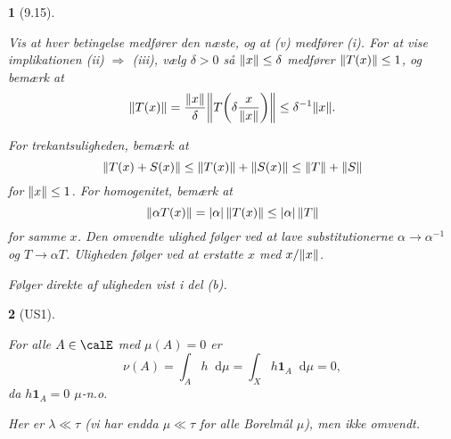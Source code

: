 \documentclass[a4paper, 11pt, article, danish, oneside]{memoir}
\newcommand{\blank}{\mathrel{\;\cdot\;}}
\newcommand{\blankifempty}[1]{\ifstrempty{#1}{\blank}{#1}}
\DeclarePairedDelimiter{\auxdelimlvert}{\lvert}{\rvert}
\DeclarePairedDelimiter{\auxdelimlVert}{\lVert}{\rVert}
\newcommand{\abs}[2][]{\auxdelimlvert[#1]{\blankifempty{#2}}}
\newcommand{\norm}[2][]{\auxdelimlVert[#1]{\blankifempty{#2}}}
\newcommand{\dif}{\mathop{}\!\mathrm{d}}
\newcommand{\indicator}[1]{\mathbf{1}_{#1}}
\newcommand\inv{^{-1}}
\newcommand{\pencilsymbol}{\raisebox{-2pt}{\normalfont\PencilLeft}}
\theoremstyle{changedotcustomnumber}
\theoremstyle{changedotbreakcustomnumber}
\newtheorem{opgavebreak}{\pencilsymbol}
\begin{document}
\begin{opgavebreak}[9.15]
\begin{solutionsec}
    \item Vis at hver betingelse medfører den næste, og at (v) medfører (i). For at vise implikationen (ii) $\Rightarrow$ (iii), vælg $\delta > 0$ så $\norm{x} \leq \delta$ medfører $\norm{T(x)} \leq 1$, og bemærk at
    \begin{equation*}
		\norm{T(x)}
			= \frac{\norm{x}}{\delta} \norm[\bigg]{T \biggl( \delta \frac{x}{\norm{x}} \biggr) }
			\leq \delta\inv \norm{x}.
	\end{equation*}

    \item For trekantsuligheden, bemærk at
    \begin{equation*}
        \norm{T(x) + S(x)}
            \leq \norm{T(x)} + \norm{S(x)}
            \leq \norm{T} + \norm{S}
    \end{equation*}
    for $\norm{x} \leq 1$. For homogenitet, bemærk at
    \begin{equation*}
        \norm{\alpha T(x)}
            = \abs{\alpha} \, \norm{T(x)}
            \leq \abs{\alpha} \, \norm{T}
    \end{equation*}
    for samme $x$. Den omvendte ulighed følger ved at lave substitutionerne $\alpha \to \alpha\inv$ og $T \to \alpha T$. Uligheden følger ved at erstatte $x$ med $x/\norm{x}$.

    \item Følger direkte af uligheden vist i del (b).
\end{solutionsec}
\end{opgavebreak}


\begin{opgavebreak}[US1]
\begin{solutionsec}
    \item For alle $A \in \calE$ med $\mu(A) = 0$ er
    \begin{equation*}
        \nu(A)
            = \int_A h \dif\mu
            = \int_X h \indicator{A} \dif\mu
            = 0,
    \end{equation*}
    da $h \indicator{A} = 0$ $\mu$-n.o.

    \item Her er $\lambda \ll \tau$ (vi har endda $\mu \ll \tau$ for alle Borelmål $\mu$), men ikke omvendt.
\end{solutionsec}
\end{opgavebreak}
\end{document}
